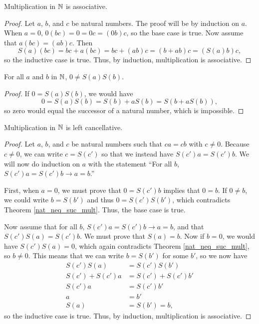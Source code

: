 \documentclass[../math.tex]{subfiles}
\begin{document}
\begin{instance}
    Multiplication in $\mathbb{N}$ is associative.
\end{instance}
\begin{proof}
    Let $a$, $b$, and $c$ be natural numbers.  The proof will be by induction on
    $a$.  When $a = 0$, $0(bc) = 0 = 0c = (0b)c$, so the base case is true.  Now
    assume that $a(bc) = (ab)c$.  Then
    \[
        S(a)(bc) = bc + a(bc) = bc + (ab)c = (b + ab)c = (S(a)b)c,
    \]
    so the inductive case is true.  Thus, by induction, multiplication is
    associative.
\end{proof}

\begin{theorem} \label{nat_neq_suc_mult}
    For all $a$ and $b$ in $\mathbb{N}$, $0 \neq S(a)S(b)$.
\end{theorem}
\begin{proof}
    If $0 = S(a)S(b)$, we would have
    \[
        0 = S(a)S(b) = S(b) + aS(b) = S(b + aS(b)),
    \]
    so zero would equal the successor of a natural number, which is impossible.
\end{proof}

\begin{instance}
    Multiplication in $\mathbb{N}$ is left cancellative.
\end{instance}
\begin{proof}
    Let $a$, $b$, and $c$ be natural numbers such that $ca = cb$ with $c \neq
    0$.  Because $c \neq 0$, we can write $c = S(c')$ so that we instead have
    $S(c')a = S(c')b$.  We will now do induction on $a$ with the statement ``For
    all $b$, $S(c')a = S(c')b \rightarrow a = b$.''

    First, when $a = 0$, we must prove that $0 = S(c')b$ implies that $0 = b$.
    If $0 \neq b$, we could write $b = S(b')$ and thus $0 = S(c')S(b')$, which
    contradicts Theorem \ref{nat_neq_suc_mult}.  Thus, the base case is true.

    Now assume that for all $b$, $S(c')a = S(c')b \rightarrow a = b$, and that
    $S(c')S(a) = S(c')b$.  We must prove that $S(a) = b$.  Now if $b = 0$, we
    would have $S(c')S(a) = 0$, which again contradicts Theorem
    \ref{nat_neq_suc_mult}, so $b \neq 0$.  This means that we can write $b =
    S(b')$ for some $b'$, so we now have
    \begin{align*}
        S(c')S(a) &= S(c')S(b') \\
        S(c') + S(c')a &= S(c') + S(c')b' \\
        S(c')a &= S(c')b' \\
        a &= b' \\
        S(a) &= S(b') = b,
    \end{align*}
    so the inductive case is true.  Thus, by induction, multiplication is
    associative.
\end{proof}
\end{document}
